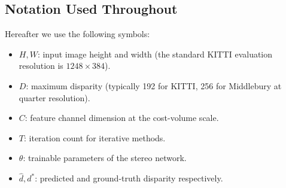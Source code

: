 \subsection{Notation Used Throughout}

Hereafter we use the following symbols:
\begin{itemize}
\item $H, W$: input image height and width (the standard KITTI evaluation resolution is $1248 \times 384$).
\item $D$: maximum disparity (typically 192 for KITTI, 256 for Middlebury at quarter resolution).
\item $C$: feature channel dimension at the cost-volume scale.
\item $T$: iteration count for iterative methods.
\item $\theta$: trainable parameters of the stereo network.
\item $\hat{d}, d^*$: predicted and ground-truth disparity respectively.
\end{itemize}
